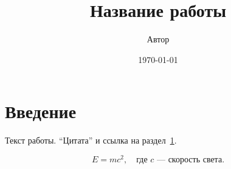 \documentclass[a4paper,12pt]{article}
\title{Название работы}
\author{Автор}
\date{\today}
\begin{document}
\maketitle

\section{Введение}\label{sec:intro}
Текст работы. \enquote{Цитата} и ссылка на раздел~\ref{sec:intro}.

\begin{equation}
  E = mc^2, \quad \text{где } c \text{ — скорость света.}
\end{equation}

\end{document}
